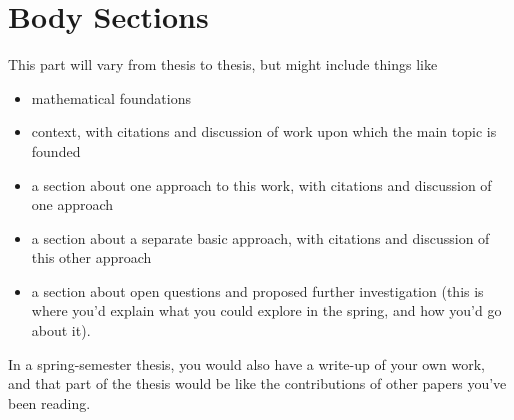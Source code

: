 \section{Body Sections}

This part will vary from thesis to thesis, but might include things like

\begin{itemize}
\item mathematical foundations
\item context, with citations and discussion of work upon which the main topic is founded
\item a section about one approach to this work, with citations and discussion of one approach
\item a section about a separate basic approach, with citations and discussion of this other approach
\item a section about open questions and proposed further investigation (this is where you'd explain what you could explore in the spring, and how you'd go about it).
\end{itemize}

In a spring-semester thesis, you would also have a write-up of your own work,
and that part of the thesis would be like the contributions of other papers
you've been reading.
